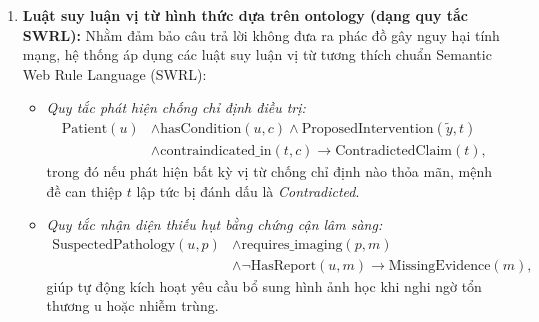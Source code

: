 \begin{enumerate}
    \item \textbf{Luật suy luận vị từ hình thức dựa trên ontology (dạng quy tắc SWRL):} Nhằm đảm bảo câu trả lời không đưa ra phác đồ gây nguy hại tính mạng, hệ thống áp dụng các luật suy luận vị từ tương thích chuẩn Semantic Web Rule Language (SWRL):
    \begin{itemize}
        \item \emph{Quy tắc phát hiện chống chỉ định điều trị:}
        \begin{equation}
        \begin{aligned}
            \mathrm{Patient}(u) &\wedge \mathrm{hasCondition}(u, c) \wedge \mathrm{ProposedIntervention}(\widetilde{y}, t) \\
            &\wedge \mathrm{contraindicated\_in}(t, c) \longrightarrow \mathrm{ContradictedClaim}(t),
        \end{aligned}
        \end{equation}
        trong đó nếu phát hiện bất kỳ vị từ chống chỉ định nào thỏa mãn, mệnh đề can thiệp $t$ lập tức bị đánh dấu là \emph{Contradicted}.
        \item \emph{Quy tắc nhận diện thiếu hụt bằng chứng cận lâm sàng:}
        \begin{equation}
        \begin{aligned}
            \mathrm{SuspectedPathology}(u, p) &\wedge \mathrm{requires\_imaging}(p, m) \\
            &\wedge \neg\mathrm{HasReport}(u, m) \longrightarrow \mathrm{MissingEvidence}(m),
        \end{aligned}
        \end{equation}
        giúp tự động kích hoạt yêu cầu bổ sung hình ảnh học khi nghi ngờ tổn thương u hoặc nhiễm trùng.
    \end{itemize}


\end{enumerate}
